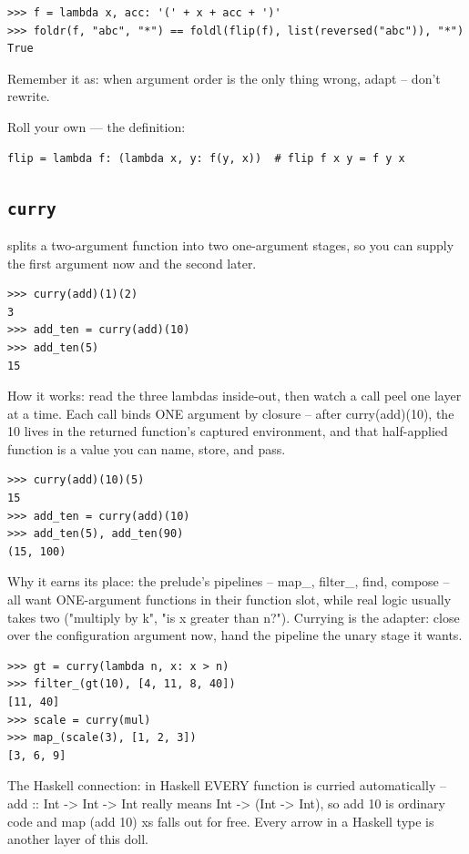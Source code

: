 \documentclass[10pt,letterpaper]{book}
\begin{document}
\begin{lstlisting}[style=ex]
>>> f = lambda x, acc: '(' + x + acc + ')'
>>> foldr(f, "abc", "*") == foldl(flip(f), list(reversed("abc")), "*")
True
\end{lstlisting}

Remember it as: when argument order is the only thing wrong, adapt -- don't rewrite.


Roll your own --- the definition:

\begin{lstlisting}[style=ex]
flip = lambda f: (lambda x, y: f(y, x))  # flip f x y = f y x
\end{lstlisting}
\subsection{\texttt{curry}}\label{def:curry}
splits a two-argument function into two one-argument stages, so you can supply the first argument now and the second later.
\begin{lstlisting}[style=ex]
>>> curry(add)(1)(2)
3
>>> add_ten = curry(add)(10)
>>> add_ten(5)
15
\end{lstlisting}

How it works: read the three lambdas inside-out, then watch a call peel one layer at a time. Each call binds ONE argument by closure -- after curry(add)(10), the 10 lives in the returned function's captured environment, and that half-applied function is a value you can name, store, and pass.

\begin{lstlisting}[style=ex]
>>> curry(add)(10)(5)
15
>>> add_ten = curry(add)(10)
>>> add_ten(5), add_ten(90)
(15, 100)
\end{lstlisting}

Why it earns its place: the prelude's pipelines -- map\_, filter\_, find, compose -- all want ONE-argument functions in their function slot, while real logic usually takes two ("multiply by k", "is x greater than n?"). Currying is the adapter: close over the configuration argument now, hand the pipeline the unary stage it wants.

\begin{lstlisting}[style=ex]
>>> gt = curry(lambda n, x: x > n)
>>> filter_(gt(10), [4, 11, 8, 40])
[11, 40]
>>> scale = curry(mul)
>>> map_(scale(3), [1, 2, 3])
[3, 6, 9]
\end{lstlisting}

The Haskell connection: in Haskell EVERY function is curried automatically -- add :: Int -> Int -> Int really means Int -> (Int -> Int), so add 10 is ordinary code and map (add 10) xs falls out for free. Every arrow in a Haskell type is another layer of this doll.
\end{document}
